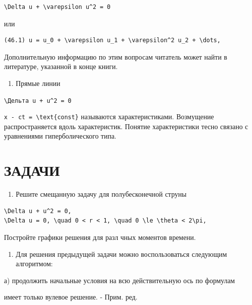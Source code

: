 \documentclass[
  ukrainian,
]{article}
\providecommand{\tightlist}{%
  \setlength{\itemsep}{0pt}\setlength{\parskip}{0pt}}
\begin{document}
\begin{verbatim}
\Delta u + \varepsilon u^2 = 0
\end{verbatim}

или

\begin{verbatim}
(46.1) u = u_0 + \varepsilon u_1 + \varepsilon^2 u_2 + \dots,
\end{verbatim}

Дополнительную информацию по этим вопросам читатель может найти в
литературе, указанной в конце книги.

\begin{enumerate}
\def\labelenumi{\arabic{enumi}.}
\setcounter{enumi}{2}
\tightlist
\item
  Прямые линии
\end{enumerate}

\texttt{\textbackslash{}Дельта\ u\ +\ u\^{}2\ =\ 0}

\texttt{x\ -\ ct\ =\ \textbackslash{}text\{const\}} называются
характеристиками. Возмущение распространяется вдоль характеристик.
Понятие характеристики тесно связано с уравнениями гиперболического
типа.

\section{ЗАДАЧИ}\label{ux437ux430ux434ux430ux447ux438-1}

\begin{enumerate}
\def\labelenumi{\arabic{enumi}.}
\tightlist
\item
  Решите смещанную задачу для полубесконечной струны
\end{enumerate}

\begin{verbatim}
\Delta u + u^2 = 0,
\Delta u = 0, \quad 0 < r < 1, \quad 0 \le \theta < 2\pi,
\end{verbatim}

Постройте графики решения для разл чных моментов времени.

\begin{enumerate}
\def\labelenumi{\arabic{enumi}.}
\setcounter{enumi}{1}
\tightlist
\item
  Для решения предыдущей задачи можно воспользоваться следующим
  алгоритмом:
\end{enumerate}

а) продолжить начальные условия на всю действительную ось по формулам

имеет только вулевое решение. - Прим. ред.
\end{document}
